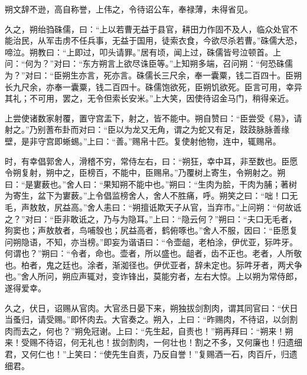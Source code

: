 \documentclass[12pt,UTF8]{ctexbook}
\begin{document}
朔文辞不逊，高自称誉，上伟之，令待诏公车，奉禄薄，未得省见。



久之，朔绐驺硃儒，曰：“上以若曹无益于县官，耕田力作固不及人，临众处官不能治民，从军击虏不任兵事，无益于国用，徒索衣食，今欲尽杀若曹。”硃儒大恐，啼泣。朔教曰：“上即过，叩头请罪。”居有顷，闻上过，硃儒皆号泣顿首。上问：“何为？”对曰：“东方朔言上欲尽诛臣等。”上知朔多端，召问朔：“何恐硃儒为？”对曰：“臣朔生亦言，死亦言。硃儒长三尺余，奉一囊粟，钱二百四十。臣朔长九尺余，亦奉一囊粟，钱二百四十。硃儒饱欲死，臣朔饥欲死。臣言可用，幸异其礼；不可用，罢之，无令但索长安米。”上大笑，因使待诏金马门，稍得亲近。



上尝使诸数家射覆，置守宫盂下，射之，皆不能中。朔自赞曰：“臣尝受《易》，请射之。”乃别蓍布卦而对曰：“臣以为龙又无角，谓之为蛇又有足，跂跂脉脉善缘壁，是非守宫即蜥蜴。”上曰：“善。”赐帛十匹。复使射他物，连中，辄赐帛。



时，有幸倡郭舍人，滑稽不穷，常侍左右，曰：“朔狂，幸中耳，非至数也。臣愿令朔复射，朔中之，臣榜百，不能中，臣赐帛。”乃覆树上寄生，令朔射之。朔曰：“是寠薮也。”舍人曰：“果知朔不能中也。”朔曰：“生肉为脍，干肉为脯；著树为寄生，盆下为寠薮。”上令倡监榜舍人，舍人不胜痛，呼。朔笑之曰：“咄！口无毛，声敖敖，尻益高。”舍人恚曰：“朔擅诋欺天子从官，当弃市。”上问朔：“何故诋之？”对曰：“臣非敢诋之，乃与为隐耳。”上曰：“隐云何？”朔曰：“夫口无毛者，狗窦也；声敖敖者，鸟哺彀也；尻益高者，鹤俯啄也。”舍人不服，因曰：“臣愿复问朔隐语，不知，亦当榜。”即妄为谐语曰：“令壶龃，老柏涂，伊优亚，狋吽牙。何谓也？”朔曰：“令者，命也。壶者，所以盛也。龃者，齿不正也。老者，人所敬也。柏者，鬼之廷也。涂者，渐洳径也。伊优亚者，辞未定也。狋吽牙者，两犬争也。”舍人所问，朔应声辄对，变诈锋出，莫能穷者，左右大惊。上以朔为常侍郎，遂得爱幸。



久之，伏日，诏赐从官肉。大官丞日晏下来，朔独拔剑割肉，谓其同官曰：“伏日当蚤归，请受赐。”即怀肉去。大官奏之。朔入，上曰：“昨赐肉，不待诏，以剑割肉而去之，何也？”朔免冠谢。上曰：“先生起，自责也！”朔再拜曰：“朔来！朔来！受赐不待诏，何无礼也！拔剑割肉，一何壮也！割之不多，又何廉也！归遗细君，又何仁也！”上笑曰：“使先生自责，乃反自誉！”复赐酒一石，肉百斤，归遗细君。
\end{document}
